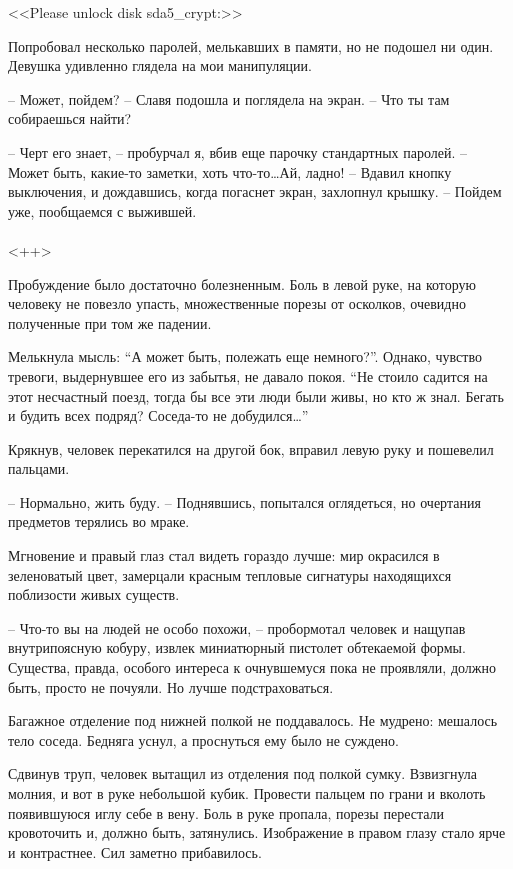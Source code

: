 \documentclass[a4paper]{book}
\begin{document}
<<Please unlock disk sda5\_crypt:>>

Попробовал несколько паролей, мелькавших в памяти, но не подошел ни один.  Девушка удивленно глядела на мои манипуляции. 

-- Может, пойдем? -- Славя подошла и поглядела на экран. -- Что ты там собираешься найти?

-- Черт его знает, -- пробурчал я, вбив еще парочку стандартных паролей. -- Может быть, какие-то заметки, хоть что-то\ldots Ай, ладно! -- Вдавил кнопку выключения, и дождавшись, когда погаснет экран, захлопнул крышку. -- Пойдем уже, пообщаемся с выжившей. 

\paragraph{}<++>

Пробуждение было достаточно болезненным. Боль в левой руке, на которую человеку не повезло упасть, множественные порезы от осколков, очевидно полученные при том же падении. 

Мелькнула мысль: ``А может быть, полежать еще немного?''. Однако, чувство тревоги, выдернувшее его из забытья, не давало покоя. ``Не стоило садится на этот несчастный поезд, тогда бы все эти люди были живы, но кто ж знал. Бегать и будить всех подряд? Соседа-то не добудился\ldots''

Крякнув, человек перекатился на другой бок, вправил левую руку и пошевелил пальцами.

-- Нормально, жить буду. -- Поднявшись, попытался оглядеться, но очертания предметов терялись во мраке.

Мгновение и правый глаз стал видеть гораздо лучше: мир окрасился в зеленоватый цвет, замерцали красным тепловые сигнатуры находящихся поблизости живых существ. 

-- Что-то вы на людей не особо похожи, -- пробормотал человек и нащупав внутрипоясную кобуру, извлек миниатюрный пистолет обтекаемой формы. Существа, правда, особого интереса к очнувшемуся пока  не проявляли, должно быть, просто не почуяли. Но лучше подстраховаться. 

Багажное отделение под нижней полкой не поддавалось. Не мудрено: мешалось тело соседа. Бедняга уснул, а проснуться ему было не суждено.

Сдвинув труп, человек вытащил из отделения под полкой сумку. Взвизгнула молния, и вот в руке небольшой  кубик. Провести пальцем по грани и вколоть появившуюся иглу себе в вену. Боль в руке пропала, порезы перестали кровоточить и, должно быть, затянулись. Изображение в правом глазу стало ярче и контрастнее. Сил заметно прибавилось. 
\end{document}
